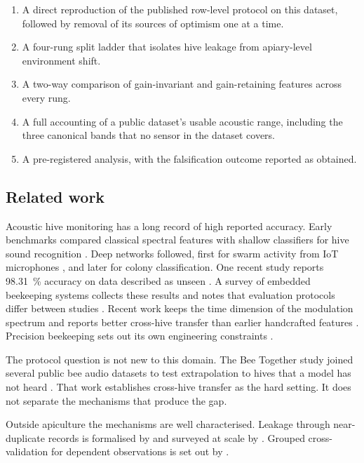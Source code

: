 ﻿\documentclass[review,12pt]{elsarticle}
\begin{document}
\begin{enumerate}
\item A direct reproduction of the published row-level protocol on this dataset,
      followed by removal of its sources of optimism one at a time.
\item A four-rung split ladder that isolates hive leakage from apiary-level
      environment shift.
\item A two-way comparison of gain-invariant and gain-retaining features across
      every rung.
\item A full accounting of a public dataset's usable acoustic range, including
      the three canonical bands that no sensor in the dataset covers.
\item A pre-registered analysis, with the falsification outcome reported as
      obtained.
\end{enumerate}

\subsection{Related work}

Acoustic hive monitoring has a long record of high reported accuracy.
Early benchmarks compared classical spectral features with shallow classifiers
for hive sound recognition \cite{nolasco2018tobee}.
Deep networks followed, first for swarm activity from IoT microphones
\cite{zgank2021}, and later for colony classification.
One recent study reports \SI{98.31}{\percent} accuracy on data described as
unseen \cite{harshit2025beehivesound}.
A survey of embedded beekeeping systems collects these results and notes that
evaluation protocols differ between studies \cite{sucipto2025survey}.
Recent work keeps the time dimension of the modulation spectrum and reports
better cross-hive transfer than earlier handcrafted features
\cite{abdollahi2026urban}.
Precision beekeeping sets out its own engineering constraints
\cite{zacepins2015}.

The protocol question is not new to this domain.
The Bee Together study joined several public bee audio datasets to test
extrapolation to hives that a model has not heard
\cite{bricout2024beetogether}.
That work establishes cross-hive transfer as the hard setting.
It does not separate the mechanisms that produce the gap.

Outside apiculture the mechanisms are well characterised.
Leakage through near-duplicate records is formalised by
\cite{kaufman2012leakage} and surveyed at scale by \cite{kapoor2023leakage}.
Grouped cross-validation for dependent observations is set out by
\cite{roberts2017cv}.
\end{document}
